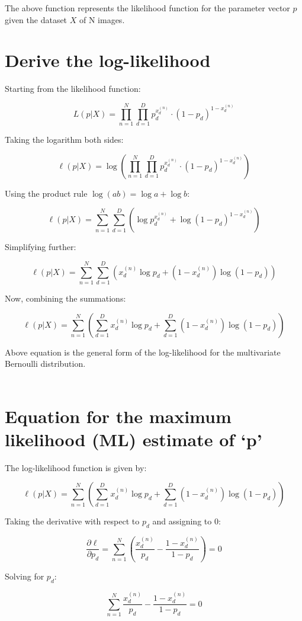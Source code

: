 \documentclass{article}
\begin{document}
The above function represents the likelihood function for the parameter vector \( p \) given the dataset \( X \) of N images.

\section{Derive the log-likelihood}
Starting from the likelihood function:

\[ L(p | X) = \prod_{n=1}^{N} \prod_{d=1}^{D} p_d^{x_d^{(n)}} \cdot (1 - p_d)^{1 - x_d^{(n)}} \]

Taking the logarithm both sides:

\[ \ell(p | X) = \log \left( \prod_{n=1}^{N} \prod_{d=1}^{D} p_d^{x_d^{(n)}} \cdot (1 - p_d)^{1 - x_d^{(n)}} \right) \]

Using the product rule \( \log(ab) = \log a + \log b \):

\[ \ell(p | X) = \sum_{n=1}^{N} \sum_{d=1}^{D} \left( \log p_d^{x_d^{(n)}} + \log (1 - p_d)^{1 - x_d^{(n)}} \right) \]

Simplifying further:

\[ \ell(p | X) = \sum_{n=1}^{N} \sum_{d=1}^{D} \left( x_d^{(n)} \log p_d + (1 - x_d^{(n)}) \log (1 - p_d) \right) \]

Now, combining the summations:

\[ \ell(p | X) = \sum_{n=1}^{N} \left( \sum_{d=1}^{D} x_d^{(n)} \log p_d + \sum_{d=1}^{D} (1 - x_d^{(n)}) \log (1 - p_d) \right) \]

Above equation is the general form of the log-likelihood for the multivariate Bernoulli distribution.\\
\\
\section{Equation for the maximum likelihood (ML) estimate of `p'}

The log-likelihood function is given by:

\[ \ell(p | X) = \sum_{n=1}^{N} \left( \sum_{d=1}^{D} x_d^{(n)} \log p_d + \sum_{d=1}^{D} (1 - x_d^{(n)}) \log (1 - p_d) \right) \]

Taking the derivative with respect to \( p_d \) and assigning to 0:

\[ \frac{\partial \ell}{\partial p_d} = \sum_{n=1}^{N} \left( \frac{x_d^{(n)}}{p_d} - \frac{1 - x_d^{(n)}}{1 - p_d} \right) = 0 \]

Solving for \( p_d \):

\[ \sum_{n=1}^{N} \frac{x_d^{(n)}}{p_d} - \frac{1 - x_d^{(n)}}{1 - p_d} = 0 \]
\end{document}
